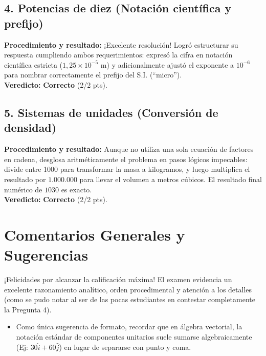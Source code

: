 \documentclass[12pt]{article}
\begin{document}
\subsection*{4. Potencias de diez (Notación científica y prefijo)}
\textbf{Procedimiento y resultado:} ¡Excelente resolución! Logró estructurar su respuesta cumpliendo ambos requerimientos: expresó la cifra en notación científica estricta ($1,25 \times 10^{-5}$ m) y adicionalmente ajustó el exponente a $10^{-6}$ para nombrar correctamente el prefijo del S.I. (``micro''). \\
\textbf{Veredicto:} \textbf{Correcto} (2/2 pts).

\subsection*{5. Sistemas de unidades (Conversión de densidad)}
\textbf{Procedimiento y resultado:} Aunque no utiliza una sola ecuación de factores en cadena, desglosa aritméticamente el problema en pasos lógicos impecables: divide entre 1000 para transformar la masa a kilogramos, y luego multiplica el resultado por $1.000.000$ para llevar el volumen a metros cúbicos. El resultado final numérico de $1030$ es exacto. \\
\textbf{Veredicto:} \textbf{Correcto} (2/2 pts).

\vspace{0.5cm}
\section*{Comentarios Generales y Sugerencias}
¡Felicidades por alcanzar la calificación máxima! El examen evidencia un excelente razonamiento analítico, orden procedimental y atención a los detalles (como se pudo notar al ser de las pocas estudiantes en contestar completamente la Pregunta 4). 
\begin{itemize}
    \item Como única sugerencia de formato, recordar que en álgebra vectorial, la notación estándar de componentes unitarios suele sumarse algebraicamente (Ej: $30\hat{i} + 60\hat{j}$) en lugar de separarse con punto y coma.
\end{itemize}
\end{document}
